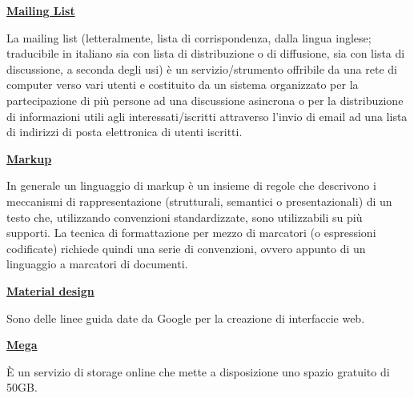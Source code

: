 \bigskip
\begin{addmargin}[0em]{0em}	
	\textbf{\underline{Mailing List}}
\end{addmargin}

\medskip
\begin{addmargin}[5em]{1em}	
La mailing list (letteralmente, lista di corrispondenza, dalla lingua inglese; traducibile in italiano sia con lista di distribuzione o di diffusione, sia con lista di discussione, a seconda degli usi) è un servizio/strumento offribile da una rete di computer verso vari utenti e costituito da un sistema organizzato per la partecipazione di più persone ad una discussione asincrona o per la distribuzione di informazioni utili agli interessati/iscritti attraverso l'invio di email ad una lista di indirizzi di posta elettronica di utenti iscritti.
\end{addmargin}	

\bigskip
\begin{addmargin}[0em]{0em}	
	\textbf{\underline{Markup}} 
\end{addmargin}

\medskip
\begin{addmargin}[5em]{1em}
In generale un linguaggio di markup è un insieme di regole che descrivono i meccanismi di rappresentazione (strutturali, semantici o presentazionali) di un testo che, utilizzando convenzioni standardizzate, sono utilizzabili su più supporti. La tecnica di formattazione per mezzo di marcatori (o espressioni codificate) richiede quindi una serie di convenzioni, ovvero appunto di un linguaggio a marcatori di documenti. 	
\end{addmargin}	

\bigskip
\begin{addmargin}[0em]{0em}	
	\textbf{\underline{Material design}}
\end{addmargin}
	
\medskip
\begin{addmargin}[5em]{1em}
Sono delle linee guida date da Google per la creazione di interfaccie web.	
\end{addmargin}	

\bigskip
\begin{addmargin}[0em]{0em}	
	\textbf{\underline{Mega}} 
\end{addmargin}
	
\medskip
\begin{addmargin}[5em]{1em}
È un servizio di storage online che mette a disposizione uno spazio gratuito di 50GB. 
\end{addmargin}	

